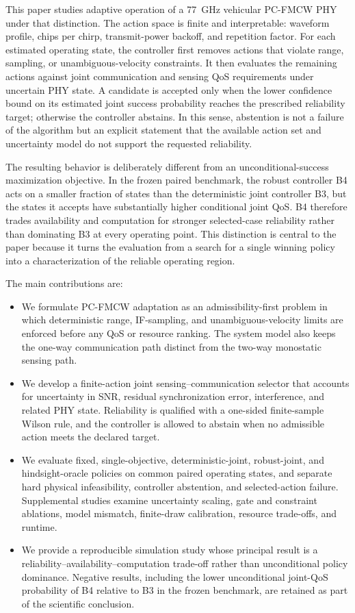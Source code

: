 \documentclass[journal]{IEEEtran}
\begin{document}
This paper studies adaptive operation of a \SI{77}{GHz} vehicular PC-FMCW PHY under that distinction. The action space is finite and interpretable: waveform profile, chips per chirp, transmit-power backoff, and repetition factor. For each estimated operating state, the controller first removes actions that violate range, sampling, or unambiguous-velocity constraints. It then evaluates the remaining actions against joint communication and sensing QoS requirements under uncertain PHY state. A candidate is accepted only when the lower confidence bound on its estimated joint success probability reaches the prescribed reliability target; otherwise the controller abstains. In this sense, abstention is not a failure of the algorithm but an explicit statement that the available action set and uncertainty model do not support the requested reliability.

The resulting behavior is deliberately different from an unconditional-success maximization objective. In the frozen paired benchmark, the robust controller B4 acts on a smaller fraction of states than the deterministic joint controller B3, but the states it accepts have substantially higher conditional joint QoS. B4 therefore trades availability and computation for stronger selected-case reliability rather than dominating B3 at every operating point. This distinction is central to the paper because it turns the evaluation from a search for a single winning policy into a characterization of the reliable operating region.

\figSystemArchitecture

The main contributions are:
\begin{itemize}
    \item We formulate PC-FMCW adaptation as an admissibility-first problem in which deterministic range, IF-sampling, and unambiguous-velocity limits are enforced before any QoS or resource ranking. The system model also keeps the one-way communication path distinct from the two-way monostatic sensing path.
    \item We develop a finite-action joint sensing--communication selector that accounts for uncertainty in SNR, residual synchronization error, interference, and related PHY state. Reliability is qualified with a one-sided finite-sample Wilson rule, and the controller is allowed to abstain when no admissible action meets the declared target.
    \item We evaluate fixed, single-objective, deterministic-joint, robust-joint, and hindsight-oracle policies on common paired operating states, and separate hard physical infeasibility, controller abstention, and selected-action failure. Supplemental studies examine uncertainty scaling, gate and constraint ablations, model mismatch, finite-draw calibration, resource trade-offs, and runtime.
    \item We provide a reproducible simulation study whose principal result is a reliability--availability--computation trade-off rather than unconditional policy dominance. Negative results, including the lower unconditional joint-QoS probability of B4 relative to B3 in the frozen benchmark, are retained as part of the scientific conclusion.
\end{itemize}
\end{document}
